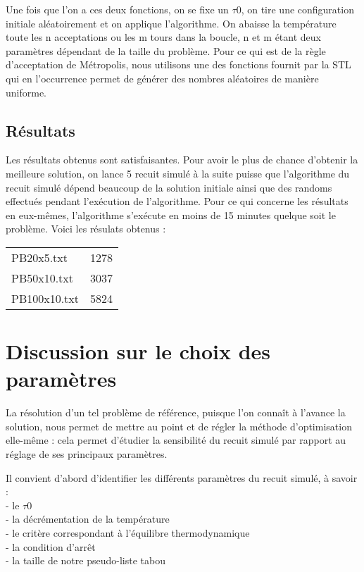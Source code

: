 \documentclass{report}
\begin{document}
Une fois que l'on a ces deux fonctions, on se fixe un $\tau 0$, on tire une configuration initiale aléatoirement et on applique l'algorithme. On abaisse la température toute les n acceptations ou les m tours dans la boucle, n et m étant deux paramètres dépendant de la taille du problème. Pour ce qui est de la règle d'acceptation de Métropolis, nous utilisons une des fonctions fournit par la STL qui en l'occurrence permet de générer des nombres aléatoires de manière uniforme.

\subsection{Résultats}
Les résultats obtenus sont satisfaisantes. Pour avoir le plus de chance d'obtenir la meilleure solution, on lance 5 recuit simulé à la suite puisse que l'algorithme du recuit simulé dépend beaucoup de la solution initiale ainsi que des randoms effectués pendant l'exécution de l'algorithme. Pour ce qui concerne les résultats en eux-mêmes, l'algorithme s'exécute en moins de 15 minutes quelque soit le problème. Voici les résulats obtenus :\\
\begin{tabular}{ll}
	PB20x5.txt & 1278 \\
	PB50x10.txt & 3037 \\
	PB100x10.txt & 5824 \\
\end{tabular}


\section{Discussion sur le choix des paramètres}
La résolution d'un tel problème de référence, puisque l'on connaît à l'avance la solution, nous permet de mettre au point et de régler la méthode d'optimisation elle-même : cela permet d'étudier la sensibilité du recuit simulé par rapport au réglage de ses principaux paramètres.

Il convient d'abord d'identifier les différents paramètres du recuit simulé, à savoir :\\
- le $\tau 0$\\
- la décrémentation de la température\\
- le critère correspondant à l'équilibre thermodynamique\\
- la condition d'arrêt\\
- la taille de notre pseudo-liste tabou\\
\end{document}
